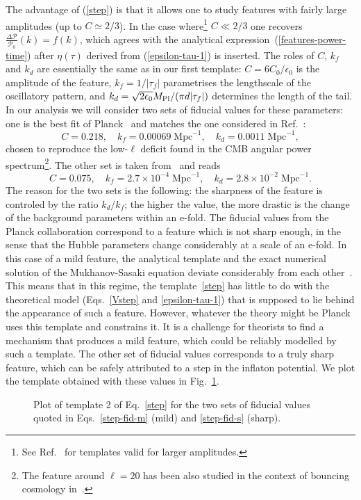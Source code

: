 \documentclass[12pt]{article}
\newcommand{\be}{\begin{equation}}
\newcommand{\ee}{\end{equation}}
\begin{document}
The advantage of (\ref{step}) is that it allows one to study features with fairly large amplitudes (up to $C \simeq 2/3$). In the case where\footnote{See Ref.~\cite{Miranda:2015cea} for templates valid for larger amplitudes.} $C \ll 2/3$ one recovers $\frac{\Delta \mathcal P}{\mathcal P_0 } (k) = f(k)$, which agrees with the analytical expression~(\ref{features-power-time}) after $\eta(\tau)$ derived from (\ref{epsilon-tau-1}) is inserted. The roles of $C$, $k_f$ and $k_d$ are essentially the same as in our first template: $C = 6 C_0 / \epsilon_0$ is the amplitude of the feature, $k_f = 1 / |\tau_f|$ parametrises the lengthscale of the oscillatory pattern, and $k_d =  \sqrt{2 \epsilon_0} M_{\rm Pl} / (\pi d |\tau_f|)$ determines the length of the tail. In our analysis we will consider two sets of fiducial values for these parameters: one is the best fit of Planck~\cite{Ade:2015lrj} and matches the one considered in Ref.~\cite{Chen:2016vvw}:
%
\be \label{step-fid-m}
C= 0.218, \quad  k_f= 0.00069\;\text{Mpc}^{-1}, \quad k_d= 0.0011\;\text{Mpc}^{-1} ,
\ee
chosen to reproduce the low-$\ell$ deficit found in the CMB angular power spectrum\footnote{The feature around $\ell=20$ has been also studied in the context of bouncing cosmology in~\cite{Cai:2017pga}.}. The other set is taken from~\cite{Miranda:2013wxa} and reads
%
\be \label{step-fid-s}
C= 0.075, \quad  k_f= 2.7\times10^{-4}\;\text{Mpc}^{-1}, \quad k_d= 2.8\times10^{-2}\;\text{Mpc}^{-1}.
\ee
The reason for the two sets is the following: the sharpness of the feature is controled by the ratio $k_d/k_f$; the higher the value, the more drastic is the change of the background parameters within an e-fold. The fiducial values from the Planck collaboration correspond to a feature which is not sharp enough, in the sense that the Hubble parameters change considerably at a scale of an e-fold. In this case of a mild feature, the analytical template and the exact numerical solution of the Mukhanov-Sasaki equation deviate considerably from each other~\cite{Miranda:2013wxa,Achucarro:2014msa}. This means that in this regime, the template~\eqref{step} has little to do with the theoretical model (Eqs.~\eqref{Vstep} and \eqref{epsilon-tau-1}) that is supposed to lie behind the appearance of such a feature. However, whatever the theory might be Planck uses this template and constrains it. It is a challenge for theorists to find a mechanism that produces a mild feature, which could be reliably modelled by such a template. The other set of fiducial values corresponds to a truly sharp feature, which can be safely attributed to a step in the inflaton potential.
We plot the template obtained with these values in Fig.~\ref{fig:temp2}. 
%
\begin{figure}[h]
\centering
{}
\caption{Plot of template 2 of Eq.~\eqref{step} for the two sets of fiducial values quoted in Eqs.~\eqref{step-fid-m} (mild) and \eqref{step-fid-s} (sharp).}
\label{fig:temp2}
\end{figure}
%
\end{document}
